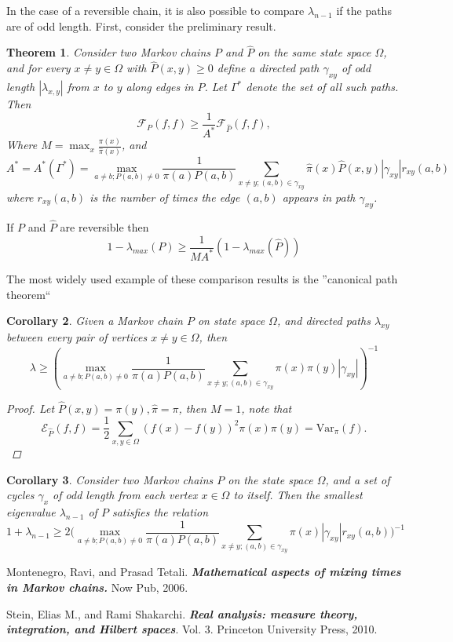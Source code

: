 \documentclass[12pt,reqno]{amsart}
\newtheorem{thm}{Theorem}[section]
\newtheorem{cor}[thm]{Corollary}
\begin{document}
In the case of a reversible chain, it is also possible to compare $\lambda_{n-1}$ if the paths are of odd length. First, consider the preliminary result.

\begin{thm}
  Consider two Markov chains $P$ and $\hat{P}$ on the same state space $\Omega$, and for every $x\neq y \in \Omega$ with $\hat{P}(x,y)\geq 0$ define a directed path $\gamma_{xy}$ of odd length $|\lambda_{x,y}|$ from $x$ to $y$ along edges in $P$. Let $\Gamma^*$ denote the set of all such paths. Then
  \begin{equation}
    \label{eq:2.16}
    \mathcal{F}_P(f,f)\geq \frac{1}{A^*}\mathcal{F}_{\hat{P}}(f,f),
  \end{equation}
Where $M=\max_x\frac{\pi(x)}{\hat{\pi}(x)}$, and
$$
A^* = A^*(\Gamma^*) = \max_{a \neq b;P(a,b)\neq 0}\frac{1}{\pi(a)P(a,b)}\sum_{x\neq y;(a,b)\in \gamma_{xy}}
\hat{\pi}(x)\hat{P}(x,y)|\gamma_{xy}|r_{xy}(a,b)
$$  
where $r_{xy}(a,b)$ is the number of times the edge $(a,b)$ appears in path $\gamma_{xy}$.
\end{thm}
If $P$ and $\hat{P}$ are reversible then
$$
1 - \lambda_{max}(P) \geq \frac{1}{MA^*}(1-\lambda_{max}(\hat{P}))
$$

The most widely used example of these comparison results is the ”canonical path theorem“
\begin{cor}
Given a Markov chain $P$ on state space $\Omega$, and directed paths $\lambda_{xy}$ between every pair of vertices $x\neq y \in \Omega$, then
$$
\lambda \geq (\max_{a \neq b;P(a,b)\neq 0}\frac{1}{\pi(a)P(a,b)}\sum_{x\neq y;(a,b)\in \gamma_{xy}}
\pi(x)\pi(y)|\gamma_{xy}|)^{-1}
$$
\begin{proof}
  Let $\hat{P}(x,y)=\pi(y), \hat{\pi}=\pi$, then $M=1$, note that
$$
\mathcal{E}_{\hat{P}}(f,f) = \frac{1}{2}\sum_{x,y\in \Omega}(f(x)-f(y))^2\pi(x)\pi(y)=\mbox{Var}_{\pi}(f).
$$
\end{proof}
\end{cor}

\begin{cor}
    Consider two Markov chains $P$ on the  state space $\Omega$, and a set of cycles $\gamma_x$ of odd length from each vertex $x\in \Omega$ to itself. Then the smallest eigenvalue $\lambda_{n-1}$ of $P$ satisfies the relation
$$
1+\lambda_{n-1} \geq 2\bigg (\max_{a \neq b;P(a,b)\neq 0}\frac{1}{\pi(a)P(a,b)}\sum_{x\neq y;(a,b)\in \gamma_{xy}}
\pi(x)|\gamma_{xy}|r_{xy}(a,b)\bigg)^{-1}
$$

\end{cor}


\begin{thebibliography}{99} %

Montenegro, Ravi, and Prasad Tetali. \textbf{\emph{Mathematical aspects of mixing times in Markov chains.}} Now Pub, 2006.

Stein, Elias M., and Rami Shakarchi. \textbf{\emph{Real analysis: measure theory, integration, and Hilbert spaces}}. Vol. 3. Princeton University Press, 2010.

\end{thebibliography}
\end{document}
